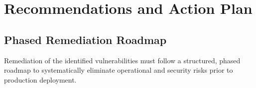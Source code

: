\documentclass[10pt,a4paper]{report}
\begin{document}
\chapter{Recommendations and Action Plan}

\section{Phased Remediation Roadmap}
Remediation of the identified vulnerabilities must follow a structured, phased roadmap to systematically eliminate operational and security risks prior to production deployment.
\end{document}

